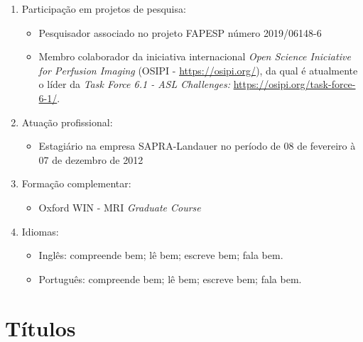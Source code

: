 \documentclass[a4paper,oneside,10pt]{article}
\begin{document}
{\begin{enumerate}
        \item Participação em projetos de pesquisa:
        \begin{itemize}
                \item Pesquisador associado no projeto FAPESP número 2019/06148-6 \mbox{} \\
                \item Membro colaborador da iniciativa internacional \textit{Open Science Iniciative for Perfusion Imaging} (OSIPI - \url{https://osipi.org/}), da qual é atualmente o líder 
        da \textit{Task Force 6.1 - ASL Challenges:} \url{https://osipi.org/task-force-6-1/}.
        \end{itemize}

        \item Atuação profissional:
        \begin{itemize}
                \item Estagiário na empresa SAPRA-Landauer no período de 08 de fevereiro à 07 de dezembro de 2012 \mbox{}
        \end{itemize}

        \item Formação complementar:
        \begin{itemize}
                \item Oxford WIN - MRI \textit{Graduate Course} \mbox{} \\
        \end{itemize}

        \item Idiomas:
        \begin{itemize}
                \item Inglês: compreende bem; lê bem; escreve bem; fala bem.
                \item Português: compreende bem; lê bem; escreve bem; fala bem.
        \end{itemize}
\end{enumerate}}

\newpage
\section{Títulos}
\end{document}
